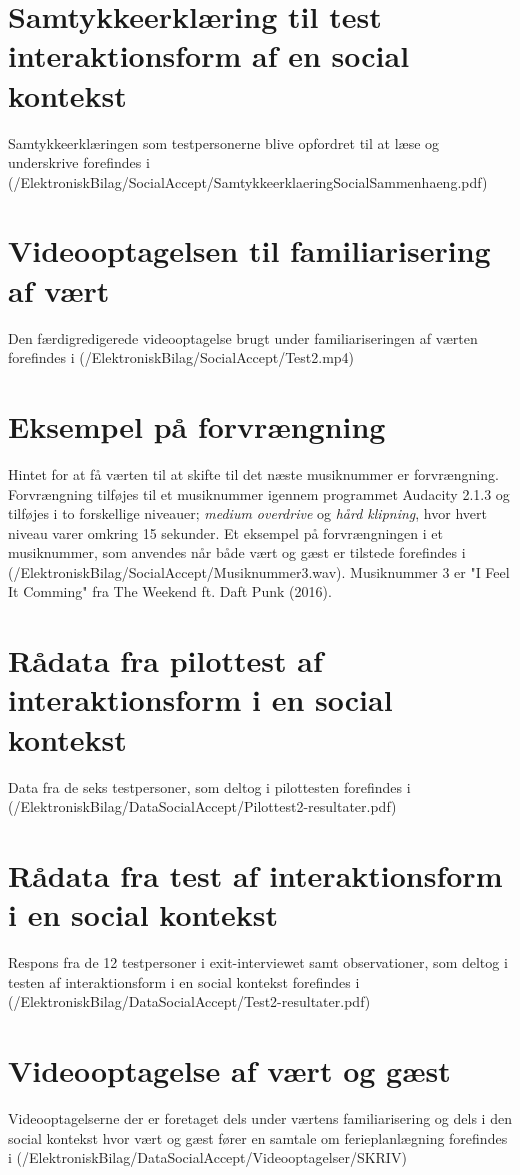\section{Samtykkeerklæring til test interaktionsform af en social kontekst}
\label{app:SamtykkeerklaeringSocialAccept}
%
Samtykkeerklæringen som testpersonerne blive opfordret til at læse og underskrive forefindes i (/ElektroniskBilag/SocialAccept/SamtykkeerklaeringSocialSammenhaeng.pdf)
%
\section{Videooptagelsen til familiarisering af vært}
\label{app:VideooptagelseFam}
%
Den færdigredigerede videooptagelse brugt under familiariseringen af værten forefindes i (/ElektroniskBilag/SocialAccept/Test2.mp4)
%
\section{Eksempel på forvrængning}
\label{app:ForvraengningHint}
%
Hintet for at få værten til at skifte til det næste musiknummer er forvrængning. Forvrængning tilføjes til et musiknummer igennem programmet Audacity 2.1.3 og tilføjes i to forskellige niveauer; \textit{medium overdrive} og \textit{hård klipning}, hvor hvert niveau varer omkring 15 sekunder. Et eksempel på forvrængningen i et musiknummer, som anvendes når både vært og gæst er tilstede forefindes i (/ElektroniskBilag/SocialAccept/Musiknummer3.wav). Musiknummer 3 er "I Feel It Comming" fra The Weekend ft. Daft Punk (2016).
%
\section{Rådata fra pilottest af interaktionsform i en social kontekst}
\label{app:ResultaterPilottestSocialAccept}
%
Data fra de seks testpersoner, som deltog i pilottesten forefindes i \\
(/ElektroniskBilag/DataSocialAccept/Pilottest2-resultater.pdf)
%
\section{Rådata fra test af interaktionsform i en social kontekst}
\label{app:ResultaterSocialAccept}
%
Respons fra de 12 testpersoner i exit-interviewet samt observationer, som deltog i testen af interaktionsform i en social kontekst forefindes i (/ElektroniskBilag/DataSocialAccept/Test2-resultater.pdf)
%
\section{Videooptagelse af vært og gæst}
\label{app:VideooptagelseVaertOgGaest}
%
Videooptagelserne der er foretaget dels under værtens familiarisering og dels i den social kontekst hvor vært og gæst fører en samtale om ferieplanlægning forefindes i (/ElektroniskBilag/DataSocialAccept/Videooptagelser/SKRIV)


